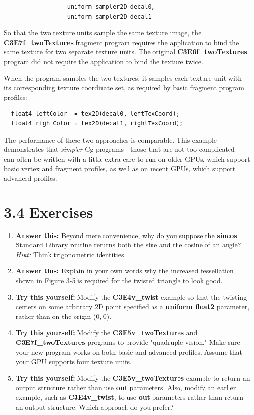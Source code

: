 \documentclass{book}
\begin{document}
\FloatBarrier
\begin{lstlisting}                  
                  uniform sampler2D decal0,
                  uniform sampler2D decal1
\end{lstlisting}
\FloatBarrier

So that the two texture units sample the same texture image, the \textbf{C3E7f_twoTextures} fragment program requires the application to bind the same texture for two separate texture units. The original \textbf{C3E6f_twoTextures} program did not require the application to bind the texture twice.

When the program samples the two textures, it samples each texture unit with its corresponding texture coordinate set, as required by basic fragment program profiles:

\FloatBarrier
\begin{lstlisting} 
  float4 leftColor  = tex2D(decal0, leftTexCoord);
  float4 rightColor = tex2D(decal1, rightTexCoord);
\end{lstlisting}
\FloatBarrier

The performance of these two approaches is comparable. This example demonstrates that \textit{simpler} Cg programs—those that are not too complicated—can often be written with a little extra care to run on older GPUs, which support basic vertex and fragment profiles, as well as on recent GPUs, which support advanced profiles.

\section{3.4 Exercises}

\begin{enumerate}
\item \textbf{Answer this:} Beyond mere convenience, why do you suppose the \textbf{sincos} Standard Library routine returns both the sine and the cosine of an angle? \textit{Hint:} Think trigonometric identities.
\item \textbf{Answer this:} Explain in your own words why the increased tessellation shown in Figure 3-5 is required for the twisted triangle to look good.
\item \textbf{Try this yourself:} Modify the \textbf{C3E4v_twist} example so that the twisting centers on some arbitrary 2D point specified as a \textbf{uniform float2} parameter, rather than on the origin (0, 0).
\item \textbf{Try this yourself:} Modify the \textbf{C3E5v_twoTextures} and \textbf{C3E7f_twoTextures} programs to provide "quadruple vision." Make sure your new program works on both basic and advanced profiles. Assume that your GPU supports four texture units.
\item \textbf{Try this yourself:} Modify the \textbf{C3E5v_twoTextures} example to return an output structure rather than use \textbf{out} parameters. Also, modify an earlier example, such as \textbf{C3E4v_twist}, to use \textbf{out} parameters rather than return an output structure. Which approach do you prefer?
\end{enumerate}
\end{document}
